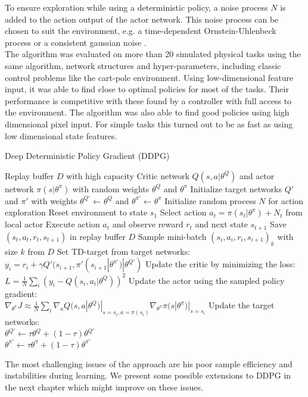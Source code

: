 To ensure exploration while using a deterministic policy, a noise process $\mathit{N}$ is added to the action output of the actor network. This noise process can be chosen to suit the environment, e.g. a time-dependent Ornstein-Uhlenbeck process \citep{ricciardi1979ornstein} or a consistent gaussian noise \citep{barth2018distributed}.\\
The algorithm was evaluated on more than 20 simulated physical tasks using the same algorithm, network structures and hyper-parameters, including classic control problems like the cart-pole environment. Using low-dimensional feature input, it was able to find close to optimal policies for most of the tasks. Their performance is competitive with these found by a controller with full access to the environment. The algorithm was also able to find good policies using high dimensional pixel input. For simple tasks this turned out to be as fast as using low dimensional state features.\\
\begin{algorithm} [H]
	\caption{Deep Deterministic Policy Gradient (DDPG)}\label{DDPG-algo}
	\begin{algorithmic}
		\REQUIRE Replay buffer $\mathit{D}$ with high capacity
		\REQUIRE Critic network $Q(s,a|\theta^Q)$ and actor network $\pi(s|\theta^\pi)$ with random weights $\theta^Q$ and $\theta^\pi$
		\REQUIRE Initialize target networks $Q'$ and $\pi'$ with weights $\theta^{Q'}\leftarrow\theta^Q$ and $\theta^{\pi'}\leftarrow\theta^\pi$
		\STATE Initialize random process $\mathit{N}$ for action exploration
		\STATE Reset environment to state $s_1$
		\STATE Select action $a_t = \pi(s_t|\theta^\pi) + \mathit{N}_t$ from local actor
		\STATE Execute action $a_t$ and observe reward $r_t$ and next state $s_{t+1}$
		\STATE Save $(s_t, a_t, r_t,s_{t+1})$ in replay buffer $D$
		\STATE Sample mini-batch $(s_i, a_i, r_i,s_{i+1})_k$ with size $k$ from $D$
		\STATE Set TD-target from target networks:\\
		\qquad $y_i = r_i + \gamma Q'(s_{i+1}, \pi'(s_{i+1}|\theta^{\pi'})|\theta^{Q'})$
		\STATE Update the critic by minimizing the loss:\\
		\qquad $L=\frac{1}{N}\sum_i(y_i - Q(s_i,a_i|\theta^Q))^2$
		\STATE Update the actor using the sampled policy gradient:\\ 			\qquad $\nabla_{\theta^\pi}J \approx \frac{1}{N} \sum_i \nabla_a Q(s,a|\theta^Q)|_{s=s_i, a=\pi(s_i)}\nabla_{\theta^\pi}\pi(s|\theta^\pi)|_{s=s_i}$
		\STATE Update the target networks:\\
		\qquad $\theta^{Q'}\leftarrow \tau \theta^Q + (1-\tau)\theta^{Q'}$\\
		\qquad $\theta^{\pi'}\leftarrow \tau \theta^\pi + (1-\tau)\theta^{\pi'}$
		\ENDFOR
		\ENDFOR
	\end{algorithmic}
\end{algorithm}
The most challenging issues of the approach are his poor sample efficiency and instabilities during learning. We present some possible extensions to DDPG in the next chapter which might improve on these issues.


